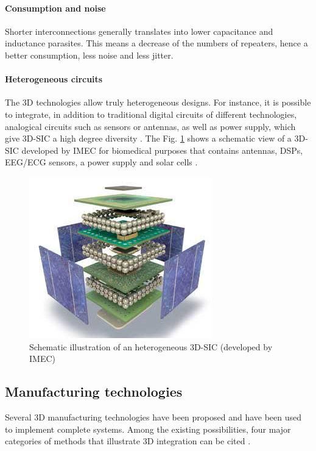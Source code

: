 \paragraph{Consumption and noise}

Shorter interconnections generally translates into lower capacitance and inductance parasites. This means a decrease of the numbers of repeaters, hence a better consumption, less noise and less jitter.

\paragraph{Heterogeneous circuits}

The 3D technologies allow truly heterogeneous designs. For instance, it is possible to integrate, in addition to traditional digital circuits of different technologies, analogical circuits such as sensors or antennas, as well as power supply, which give 3D-SIC a high degree diversity \cite{4299568}. The Fig. \ref{fig:heterogeneity} shows a schematic view of a 3D-SIC developed by IMEC for biomedical purposes that contains antennas, DSPs, EEG/ECG sensors, a power supply and solar cells \cite{4198870}.

\begin{figure}[h!]
\begin{center}
\includegraphics[width=0.5\linewidth]{heterogeneity.png}
\end{center}
\vspace{-0.5cm}
\caption{Schematic illustration of an heterogeneous 3D-SIC (developed by IMEC) \cite{4198870}}
\label{fig:heterogeneity}
\end{figure}

\subsection{Manufacturing technologies}

Several 3D manufacturing technologies have been proposed and have been used to implement complete systems. Among the existing possibilities, four major categories of methods that illustrate 3D integration can be cited \cite{659500,1652906}.


